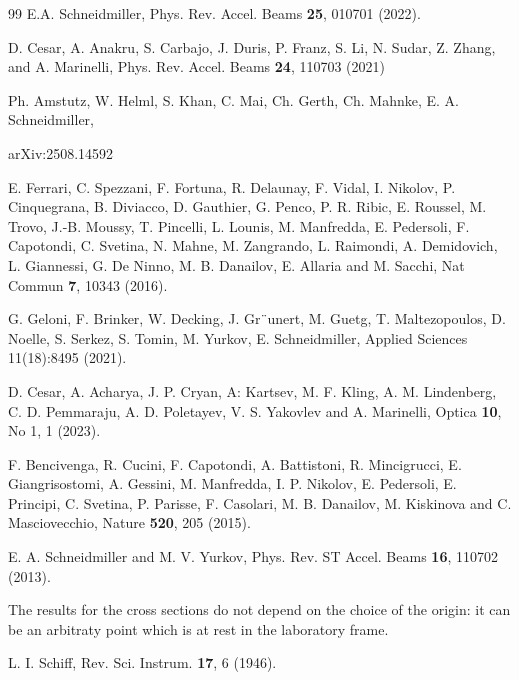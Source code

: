 \documentclass[prl, twocolumn, floatfix]{revtex4}
\begin{document}
\begin{thebibliography}{99}
 E.A. Schneidmiller, Phys. Rev. Accel. Beams {\bf 25}, 010701 (2022).

 D. Cesar, A. Anakru, S. Carbajo, J. Duris, P. Franz,
S. Li, N. Sudar, Z. Zhang, and A. Marinelli, Phys.
Rev. Accel. Beams {\bf 24}, 110703 (2021)

 Ph. Amstutz, W. Helml, S. Khan, C. Mai, Ch. Gerth, Ch. Mahnke, E. A. Schneidmiller,

arXiv:2508.14592

 E. Ferrari, C. Spezzani, F. Fortuna, R. Delaunay, F. Vidal,
I. Nikolov, P. Cinquegrana, B. Diviacco, D. Gauthier, G. Penco, P. R. Ribic,
E. Roussel, M. Trovo, J.-B. Moussy, T. Pincelli, L. Lounis, M.
Manfredda, E. Pedersoli, F. Capotondi, C. Svetina, N. Mahne, M. Zangrando,
L. Raimondi, A. Demidovich, L. Giannessi, G. De Ninno, M. B.
Danailov, E. Allaria and M. Sacchi, Nat Commun {\bf 7}, 10343 (2016).

 G. Geloni, F. Brinker, W. Decking, J. Gr¨unert,
M. Guetg, T. Maltezopoulos, D. Noelle, S. Serkez, S.
Tomin, M. Yurkov, E. Schneidmiller, Applied Sciences 11(18):8495 (2021).

 D. Cesar, A. Acharya, J. P. Cryan, A: Kartsev, M. F. Kling,
A. M. Lindenberg, C. D. Pemmaraju, A. D. Poletayev, V. S. Yakovlev and
A. Marinelli, Optica {\bf 10}, No 1, 1 (2023).

 F. Bencivenga, R. Cucini, F. Capotondi, A. Battistoni, R. Mincigrucci, E. Giangrisostomi, A. Gessini,
M. Manfredda, I. P. Nikolov, E. Pedersoli, E. Principi, C. Svetina, P. Parisse, F. Casolari, M. B. Danailov, M. Kiskinova and C. Masciovecchio, Nature {\bf 520}, 205 (2015).

 E. A. Schneidmiller and M. V. Yurkov, Phys. Rev. ST Accel. Beams {\bf 16},
110702 (2013).

 The results for the cross sections do not depend on
the choice of the origin: it can be an arbitraty point
which is at rest in the laboratory frame.

 L. I. Schiff,
Rev. Sci. Instrum. {\bf 17}, 6 (1946).


\end{thebibliography}
\end{document}
